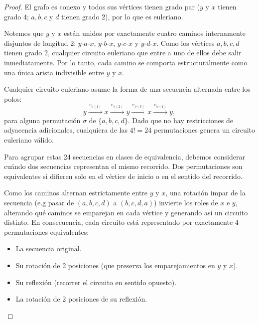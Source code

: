 \begin{center}
\end{center}
\begin{proof}
    El grafo es conexo y todos sus vértices tienen grado par (\(y\) y \(x\) tienen grado 4; \(a, b, c\) y \(d\) tienen grado 2), por lo que es euleriano.

    Notemos que \(y\) y \(x\) están unidos por exactamente cuatro caminos internamente disjuntos de longitud 2: \(y\text{-}a\text{-}x\), \(y\text{-}b\text{-}x\), \(y\text{-}c\text{-}x\) y \(y\text{-}d\text{-}x\). Como los vértices \(a, b, c, d\) tienen grado 2, cualquier circuito euleriano que entre a uno de ellos debe salir inmediatamente. Por lo tanto, cada camino se comporta estructuralmente como una única arista indivisible entre \(y\) y \(x\).

    Cualquier circuito euleriano asume la forma de una secuencia alternada entre los polos:
    \[
        y \xrightarrow{\,e_{\sigma(1)}\,} x \xrightarrow{\,e_{\sigma(2)}\,} y \xrightarrow{\,e_{\sigma(3)}\,} x \xrightarrow{\,e_{\sigma(4)}\,} y,
    \]
    para alguna permutación \( \sigma \) de \( \{a,b,c,d\} \). Dado que no hay restricciones de adyacencia adicionales, cualquiera de las \(4! = 24\) permutaciones genera un circuito euleriano válido.

    Para agrupar estas 24 secuencias en clases de equivalencia, debemos considerar cuándo dos secuencias representan el mismo recorrido. Dos permutaciones son equivalentes si difieren solo en el vértice de inicio o en el sentido del recorrido.

    Como los caminos alternan estrictamente entre \(y\) y \(x\), una rotación impar de la secuencia (e.g pasar de \((a,b,c,d)\) a \((b,c,d,a)\)) invierte los roles de \(x\) e \(y\), alterando qué caminos se emparejan en cada vértice y generando así un circuito distinto. En consecuencia, cada circuito está representado por exactamente 4 permutaciones equivalentes:
    \begin{itemize}
        \item La secuencia original.
        \item Su rotación de 2 posiciones (que preserva los emparejamientos en \(y\) y \(x\)).
        \item Su reflexión (recorrer el circuito en sentido opuesto).
        \item La rotación de 2 posiciones de su reflexión.
    \end{itemize}


\end{proof}
